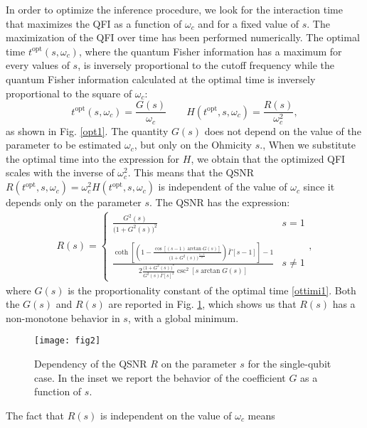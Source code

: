 \documentclass[ pra,a4paper,aps,twocolumn,superscriptaddress]{revtex4-1}
\def\tc#1{{\color{black}#1}}
\begin{document}
In order to optimize the inference procedure, we look for
the interaction time that maximizes the QFI as a function of $\omega_c$ and  for  a fixed value of $s$.
The maximization of the QFI over time has been performed numerically.
The optimal time $t^{\text{opt}}(s,\omega_c)$, where the quantum Fisher information has a maximum for every values of $s$, is inversely proportional to the cutoff frequency while the quantum Fisher information calculated at the optimal time is inversely proportional to the square of $\omega_c$:
\begin{equation}
t^{\text{opt}}(s,\omega_c)=\frac{G(s)}{\omega_{c}}\qquad H(t^{\text{opt}},s,\omega_c)=\frac{R(s)}{\omega_c^2},
\label{ottimi1}
\end{equation}
as shown in Fig. \ref{opt1}.
The quantity $G(s)$ does not depend on the value of the parameter to be estimated $\omega_c$, but only on the Ohmicity $s$., When we substitute the optimal time into the expression for $H$, we obtain that the optimized QFI scales with the inverse of $\omega_c^2$. This means that the QSNR $R(t^{\text{opt}},s,\omega_c)=\omega_c^2 H(t^{\text{opt}},s,\omega_c)$ is independent of the value of $\omega_c$ since it depends only on the parameter $s$.
The QSNR  has the expression:
 \begin{align}
  \!\!R(s)\! = 
  \! \left\{ 
  \begin{array}{ll}
  \!\! \frac{G^2(s)}{\big(1+G^2(s)\big)^2}
  &s\!=\!1\\
  \\
  \!\!\! 
   \frac{ 
   \coth\left[\!\!\left(1 - 
        \frac{ \cos[(s-1) \arctan G(s)]}{\big(1 +  G^2(s)\big)^{\frac{s-1}{2}}}\right) \bar{\Gamma}[s-1]\! \right]-1 }
         {2\frac{ \big(1+G^2\!(s)\big)^s}{G^{2}\!(s) \bar{\Gamma}[ s]^{2}}  \csc^2 \! [s \arctan G(s)]} 
  &s\!\neq\!1
  \end{array}
  \right. ,
  \label{r1}
  \end{align}
where $G(s)$ is the proportionality constant of the optimal time \eqref{ottimi1}. Both the $G(s)$ and $R(s)$ are reported in Fig. \ref{fig2}, which shows us that $R(s)$ has a non-monotone behavior in $s$, with a global minimum. 
%
\begin{figure}
 \centering
 \texttt{[image: fig2]}
\caption{\label{fig2} Dependency of the QSNR $R$ on the parameter $s$ for the single-qubit case. In the inset we 
report the behavior of the coefficient $G$ as a function of $s$.}
 \end{figure}
The fact that $R(s)$  is independent on the value of \tc{$\omega_c$} means
\end{document}
